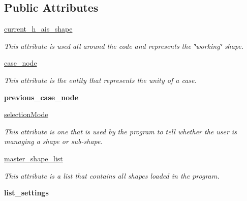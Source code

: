 \subsection*{Public Attributes}
\begin{DoxyCompactItemize}
\item 
\hyperlink{a00081_a84a62c3017515ec840e35dbbe8ccbf21}{current\+\_\+h\+\_\+ais\+\_\+shape}
\begin{DoxyCompactList}\small\item\em This attribute is used all around the code and represents the \char`\"{}working\char`\"{} shape. \end{DoxyCompactList}\item 
\hypertarget{a00081_a76f4a1191b8d68c0ed9d9f3e1e6756d8}{}\label{a00081_a76f4a1191b8d68c0ed9d9f3e1e6756d8} 
\hyperlink{a00081_a76f4a1191b8d68c0ed9d9f3e1e6756d8}{case\+\_\+node}
\begin{DoxyCompactList}\small\item\em This attribute is the entity that represents the unity of a case. \end{DoxyCompactList}\item 
\hypertarget{a00081_a43d75821c1883b1b972c8e0ef9922b4a}{}\label{a00081_a43d75821c1883b1b972c8e0ef9922b4a} 
{\bfseries previous\+\_\+case\+\_\+node}
\item 
\hypertarget{a00081_a84adec7b4b982bce58747d39e098236f}{}\label{a00081_a84adec7b4b982bce58747d39e098236f} 
\hyperlink{a00081_a84adec7b4b982bce58747d39e098236f}{selection\+Mode}
\begin{DoxyCompactList}\small\item\em This attribute is one that is used by the program to tell whether the user is managing a shape or sub-\/shape. \end{DoxyCompactList}\item 
\hypertarget{a00081_a819ef9e1cd2f233d92a5379532060bd0}{}\label{a00081_a819ef9e1cd2f233d92a5379532060bd0} 
\hyperlink{a00081_a819ef9e1cd2f233d92a5379532060bd0}{master\+\_\+shape\+\_\+list}
\begin{DoxyCompactList}\small\item\em This attribute is a list that contains all shapes loaded in the program. \end{DoxyCompactList}\item 
\hypertarget{a00081_a96038d8a4727208ba2e9cd359bcd4781}{}\label{a00081_a96038d8a4727208ba2e9cd359bcd4781} 
{\bfseries list\+\_\+settings}
\item 
\hypertarget{a00081_abfb58254f95f980e2821bac01114cd40}{}\label{a00081_abfb58254f95f980e2821bac01114cd40} 

\end{DoxyCompactItemize}
